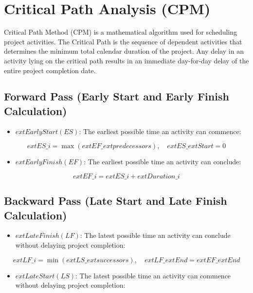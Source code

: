 \documentclass[12pt,a4paper,oneside]{report}
\begin{document}
\section{Critical Path Analysis (CPM)}

Critical Path Method (CPM) is a mathematical algorithm used for scheduling project activities. The Critical Path is the sequence of dependent activities that determines the minimum total calendar duration of the project. Any delay in an activity lying on the critical path results in an immediate day-for-day delay of the entire project completion date.

\subsection{Forward Pass (Early Start and Early Finish Calculation)}

\begin{itemize}
  \item $	ext{Early Start (ES)}$: The earliest possible time an activity can commence:
\end{itemize}

$$	ext{ES}\_i = \max(	ext{EF}\_{	ext{predecessors}}), \quad 	ext{ES}\_{	ext{Start}} = 0$$

\begin{itemize}
  \item $	ext{Early Finish (EF)}$: The earliest possible time an activity can conclude:
\end{itemize}

$$	ext{EF}\_i = 	ext{ES}\_i + 	ext{Duration}\_i$$

\subsection{Backward Pass (Late Start and Late Finish Calculation)}

\begin{itemize}
  \item $	ext{Late Finish (LF)}$: The latest possible time an activity can conclude without delaying project completion:
\end{itemize}

$$	ext{LF}\_i = \min(	ext{LS}\_{	ext{successors}}), \quad 	ext{LF}\_{	ext{End}} = 	ext{EF}\_{	ext{End}}$$

\begin{itemize}
  \item $	ext{Late Start (LS)}$: The latest possible time an activity can commence without delaying project completion:
\end{itemize}
\end{document}
